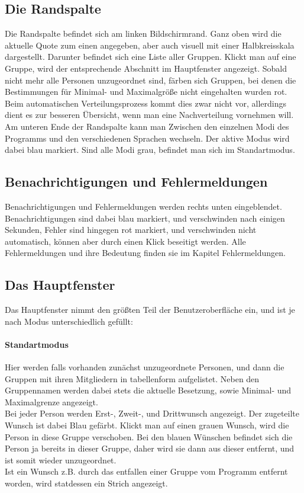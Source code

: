 \documentclass[a4paper,11pt]{article}
\begin{document}
\subsection{Die Randspalte}
\label{ssec:side-bar}
Die Randspalte befindet sich am linken Bildschirmrand. Ganz oben wird die aktuelle Quote zum einen angegeben, aber auch visuell mit einer Halbkreisskala dargestellt. Darunter befindet sich eine Liste aller Gruppen. Klickt man auf eine Gruppe, wird der entsprechende Abschnitt im Hauptfenster angezeigt. Sobald nicht mehr alle Personen unzugeordnet sind, färben sich Gruppen, bei denen die Bestimmungen für Minimal- und Maximalgröße nicht eingehalten wurden rot. Beim automatischen Verteilungsprozess kommt dies zwar nicht vor, allerdings dient es zur besseren Übersicht, wenn man eine Nachverteilung vornehmen will. \\
Am unteren Ende der Randspalte kann man Zwischen den einzelnen Modi des Programms und den verschiedenen Sprachen wechseln. Der aktive Modus wird dabei blau markiert. Sind alle Modi grau, befindet man sich im Standartmodus.

\subsection{Benachrichtigungen und Fehlermeldungen}
\label{ssec:errwindow}
Benachrichtigungen und Fehlermeldungen werden rechts unten eingeblendet. Benachrichtigungen sind dabei blau markiert, und verschwinden nach einigen Sekunden, Fehler sind hingegen rot markiert, und verschwinden nicht automatisch, können aber durch einen Klick beseitigt werden. Alle Fehlermeldungen und ihre Bedeutung finden sie im Kapitel Fehlermeldungen.


\subsection{Das Hauptfenster}
\label{ssec:main-window}
Das Hauptfenster nimmt den größten Teil der Benutzeroberfläche ein, und ist je nach Modus unterschiedlich gefüllt:
\paragraph{Standartmodus}
Hier werden falls vorhanden zunächst unzugeordnete Personen, und dann die Gruppen mit ihren Mitgliedern in tabellenform aufgelistet. Neben den Gruppennamen werden dabei stets die aktuelle Besetzung, sowie Minimal- und Maximalgrenze angezeigt. \\
Bei jeder Person werden Erst-, Zweit-, und Drittwunsch angezeigt. Der zugeteilte Wunsch ist dabei Blau gefärbt. Klickt man auf einen grauen Wunsch, wird die Person in diese Gruppe verschoben. Bei den blauen Wünschen befindet sich die Person ja bereits in dieser Gruppe, daher wird sie dann aus dieser entfernt, und ist somit wieder unzugeordnet. \\
Ist ein Wunsch z.B. durch das entfallen einer Gruppe vom Programm entfernt worden, wird statdessen ein Strich angezeigt.
\end{document}
